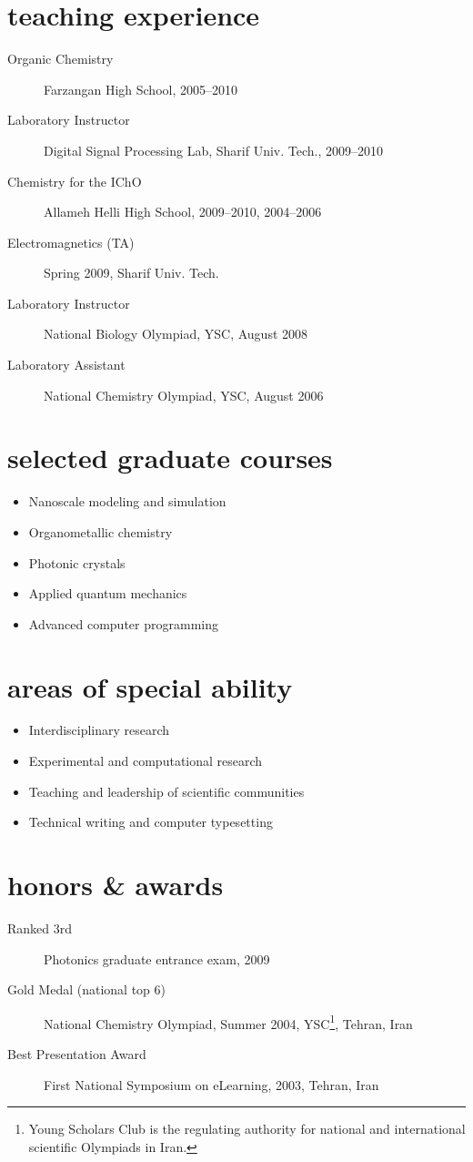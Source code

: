 \documentclass[overlapped,line,10pt,letterpaper]{res}
\begin{document}
\begin{resume}
\section{teaching experience}
\begin{description}
\item[Organic Chemistry] Farzangan High School, 2005–2010
\item[Laboratory Instructor] Digital Signal Processing Lab, Sharif Univ. Tech., 2009–2010
\item[Chemistry for the IChO] Allameh Helli High School, 2009–2010, 2004–2006
\item[Electromagnetics (TA)] Spring 2009, Sharif Univ. Tech.
\item[Laboratory Instructor] National Biology Olympiad, YSC, August 2008
\item[Laboratory Assistant] National Chemistry Olympiad, YSC, August 2006
\end{description}

\section{selected graduate courses}
\begin{itemize}
\item Nanoscale modeling and simulation
\item Organometallic chemistry
\item Photonic crystals
\item Applied quantum mechanics
\item Advanced computer programming
\end{itemize}

\section{areas of special ability}
\begin{itemize}
\item Interdisciplinary research
\item Experimental and computational research
\item Teaching and leadership of scientific communities
\item Technical writing and computer typesetting
\end{itemize}

\section{honors \& awards}
\begin{description}
\item[Ranked 3rd] Photonics graduate entrance exam, 2009 
\item[Gold Medal (national top 6)] National Chemistry Olympiad, Summer 2004, YSC\footnote{Young Scholars Club is the regulating authority for national and international scientific Olympiads in Iran.}, Tehran, Iran
\item[Best Presentation Award] First National Symposium on eLearning, 2003,
Tehran, Iran
\end{description}


\end{resume}
\end{document}
